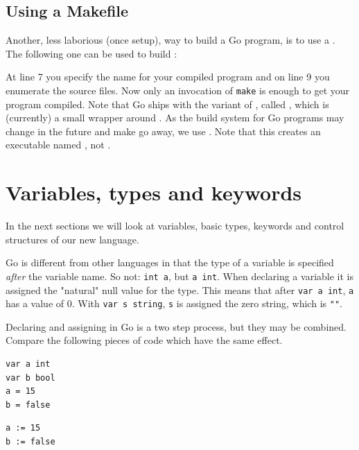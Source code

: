 \subsection{Using a Makefile}
\label{sec:building a program}
Another, less laborious (once setup), way to build a Go program, is to use a
. The following one can be used to build
:

At line 7 you specify the name for your compiled program and on line 9
you enumerate the source files. Now only an invocation of \verb|make| is
enough to get your program compiled. Note that Go ships with the variant
of , called , which is (currently) a small
wrapper around . As the build system for Go programs may
change in the future and make  go away, we use .
Note that this  creates an executable named
, not .

\section{Variables, types and keywords}
\label{sec:vars}
In the next sections we will look at variables, basic types,
keywords and control structures of our new language. 

Go is different from other languages in that the type of a variable
is specified \emph{after} the variable name. So not: 
\lstinline{int a}, but \lstinline{a int}. When declaring a variable it
is assigned the "natural" null value for the type. This means that after
\lstinline{var a int}, \lstinline{a} has a value of 0. With
\lstinline{var s string}, \lstinline{s} is assigned the zero string,
which is \lstinline{""}. 

Declaring and assigning in Go is a two step process, but they may
be combined. Compare the following pieces of code which have
the same effect. 

\begin{minipage}{.5\textwidth}
\begin{lstlisting}[linewidth=.5\textwidth,caption=Declaration with \texttt{=}]
var a int
var b bool
a = 15
b = false
\end{lstlisting}
\hfill
\end{minipage}
\begin{minipage}{.5\textwidth}
\begin{lstlisting}[linewidth=.5\textwidth,caption=Declaration with \texttt{:=}]
a := 15
b := false
\end{lstlisting}
\ \\
\ \\
\hfill
\end{minipage}

